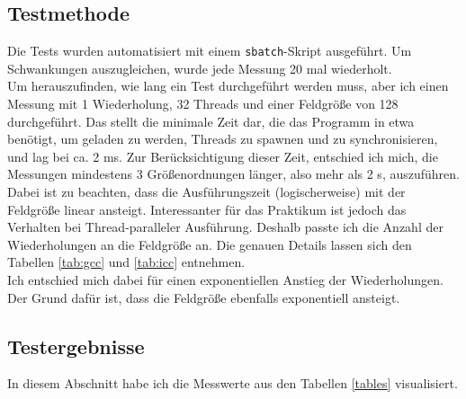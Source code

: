 \documentclass[german,plainarticle,hyperref,utf8,appendix]{zihpub}
\begin{document}
   	\subsection{Testmethode}
       Die Tests wurden automatisiert mit einem \texttt{sbatch}-Skript ausgeführt. Um Schwankungen auszugleichen, wurde jede Messung 20 mal wiederholt.\\
       Um herauszufinden, wie lang ein Test durchgeführt werden muss, aber ich einen Messung mit 1 Wiederholung, 32 Threads und einer Feldgröße von 128 durchgeführt. Das stellt die minimale Zeit dar, die das Programm in etwa benötigt, um geladen zu werden, Threads zu spawnen und zu synchronisieren, und lag bei ca. 2 ms. Zur Berücksichtigung dieser Zeit, entschied ich mich, die Messungen mindestens 3 Größenordnungen länger, also mehr als 2 s, auszuführen.\\
       Dabei ist zu beachten, dass die Ausführungszeit (logischerweise) mit der Feldgröße linear ansteigt. Interessanter für das Praktikum ist jedoch das Verhalten bei Thread-paralleler Ausführung. Deshalb passte ich die Anzahl der Wiederholungen an die Feldgröße an. Die genauen Details lassen sich den Tabellen \ref{tab:gcc} und
        \ref{tab:icc} entnehmen.\\
       Ich entschied mich dabei für einen exponentiellen Anstieg der Wiederholungen. Der Grund dafür ist, dass die Feldgröße ebenfalls exponentiell ansteigt.
       \newpage
    \subsection{Testergebnisse}
    In diesem Abschnitt habe ich die Messwerte aus den Tabellen \ref{tables} visualisiert.
\end{document}
